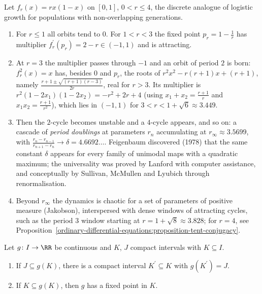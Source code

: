 \begin{example}\label{ordinary-differential-equations:example-logistic-map}
Let $f_r(x) = rx(1 - x)$ on $[0, 1]$, $0 < r \leq 4$, the discrete analogue of logistic growth for populations with non-overlapping generations.
\begin{enumerate}
\item For $r \leq 1$ all orbits tend to $0$. For $1 < r < 3$ the fixed point $p_r = 1 - \frac1r$ has multiplier $f_r^{\prime}(p_r) = 2 - r \in (-1, 1)$ and is attracting.
\item At $r = 3$ the multiplier passes through $-1$ and an orbit of period $2$ is born: $f_r^2(x) = x$ has, besides $0$ and $p_r$, the roots of $r^2x^2 - r(r + 1)x + (r + 1)$, namely $\frac{r + 1 \pm \sqrt{(r + 1)(r - 3)}}{2r}$, real for $r > 3$.
Its multiplier is $r^2(1 - 2x_1)(1 - 2x_2) = -r^2 + 2r + 4$ (using $x_1 + x_2 = \frac{r + 1}{r}$ and $x_1x_2 = \frac{r + 1}{r^2}$), which lies in $(-1, 1)$ for $3 < r < 1 + \sqrt6 \approx 3.449$.
\item Then the $2$-cycle becomes unstable and a $4$-cycle appears, and so on: a cascade of \emph{period doublings} at parameters $r_n$ accumulating at $r_\infty \approx 3.5699$, with $\frac{r_n - r_{n-1}}{r_{n+1} - r_n} \to \delta = 4.6692\ldots$. Feigenbaum
discovered (1978) that the same constant $\delta$ appears for every family of unimodal maps with a quadratic maximum; the universality was proved by Lanford with computer assistance, and conceptually by Sullivan, McMullen and Lyubich
through renormalisation.
\item Beyond $r_\infty$ the dynamics is chaotic for a set of parameters of positive measure (Jakobson), interspersed with dense windows of attracting cycles, such as the period $3$ window starting at $r = 1 + \sqrt8 \approx 3.828$; for
$r = 4$, see Proposition~\ref{ordinary-differential-equations:proposition-tent-conjugacy}.
\end{enumerate}
\end{example}

\begin{lemma}\label{ordinary-differential-equations:lemma-interval-covering}
Let $g \colon I \to \RR$ be continuous and $K$, $J$ compact intervals with $K \subseteq I$.
\begin{enumerate}
\item If $J \subseteq g(K)$, there is a compact interval $K^{\prime} \subseteq K$ with $g(K^{\prime}) = J$.
\item If $K \subseteq g(K)$, then $g$ has a fixed point in $K$.
\end{enumerate}
\end{lemma}


